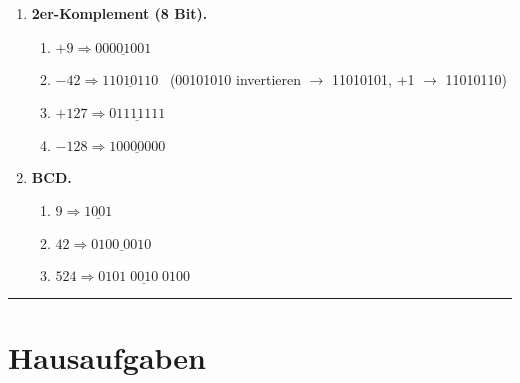 \documentclass[11pt,a4paper]{scrartcl}
\begin{document}
\begin{enumerate}[leftmargin=*,label=\textbf{Aufgabe~\arabic*:}, itemsep=0.9em]
		\item \textbf{2er-Komplement (8 Bit).}
		\begin{enumerate}[label*=\alph*)]
			\item \(+9 \Rightarrow \underline{00001001}\)
			\item \(-42 \Rightarrow \underline{11010110}\) \ (00101010 invertieren \(\to\) 11010101, +1 \(\to\) 11010110)
			\item \(+127 \Rightarrow \underline{01111111}\)
			\item \(-128 \Rightarrow \underline{10000000}\)
		\end{enumerate}
		
		\item \textbf{BCD.}
		\begin{enumerate}[label*=\alph*)]
			\item \(9 \Rightarrow \underline{1001}\)
			\item \(42 \Rightarrow \underline{0100\;0010}\)
			\item \(524 \Rightarrow \underline{0101\;0010\;0100}\)
		\end{enumerate}
		
	\end{enumerate}
	
	\hrule
	\vspace{0.6em}
	
	\section*{Hausaufgaben}
	
\end{document}
